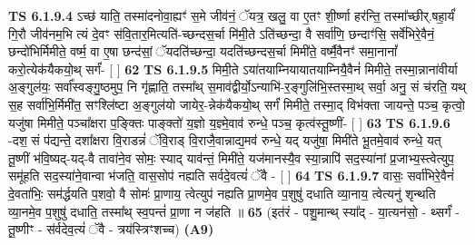 \documentclass[17pt]{extarticle}
\begin{document}
                  \newline
                                \textbf{ TS 6.1.9.4} \newline
                  ऽच्छ॑ याति॒ तस्मा॑दनोवा॒ह्यꣳ॑ स॒मे जीव॑नं॒ ॅयत्र॒ खलु॒ वा ए॒तꣳ शी॒र्ष्णा हर॑न्ति॒ तस्मा᳚च्छीर्.षहा॒र्यं॑ गि॒रौ जीव॑नम॒भि त्यं दे॒वꣳ स॑वि॒तार॒मित्यति॑-च्छन्दस॒र्चा मि॑मी॒ते ऽति॑च्छन्दा॒ वै सर्वा॑णि॒ छन्दाꣳ॑सि॒ सर्वे॑भिरे॒वैनं॒ छन्दो॑भिर्मिमीते॒ वर्ष्म॒ वा ए॒षा छन्द॑सां॒ ॅयदति॑च्छन्दा॒ यदति॑च्छन्दस॒र्चा मिमी॑ते॒ वर्ष्मै॒वैनꣳ॑ समा॒नानां᳚ करो॒त्येक॑यैकयो॒थ् सर्गं॑- [  ] \textbf{  62} \newline
                  \newline
                                \textbf{ TS 6.1.9.5} \newline
                  मिमी॒ते ऽया॑तयाम्नियायातयाम्नियै॒वैनं॑ मिमीते॒ तस्मा॒न्नाना॑वीर्या अ॒ङ्गुल॑यः॒ सर्वा᳚स्वङ्गु॒ष्ठमुप॒ नि गृ॑ह्णाति॒ तस्मा᳚थ् स॒माव॑द्वीर्यो॒ऽन्याभि॑-र॒ङ्गुलि॑भि॒स्तस्मा॒थ् सर्वा॒ अनु॒ सं च॑रति॒ यथ् स॒ह सर्वा॑भि॒र्मिमी॑त॒ सꣳश्लि॑ष्टा अ॒ङ्गुल॑यो जायेर॒-न्नेक॑यैकयो॒थ् सर्गं॑ मिमीते॒ तस्मा॒द् विभ॑क्ता जायन्ते॒ पञ्च॒ कृत्वो॒ यजु॑षा मिमीते॒ पञ्चा᳚क्षरा प॒ङ्क्तिः पाङ्क्तो॑ य॒ज्ञो य॒ज्ञ्मे॒वाव॑ रुन्धे॒ पञ्च॒ कृत्व॑स्तू॒ष्णीं- [  ] \textbf{  63} \newline
                  \newline
                                \textbf{ TS 6.1.9.6} \newline
                  -दश॒ सं प॑द्यन्ते॒ दशा᳚क्षरा वि॒राडन्नं॑ ॅवि॒राड् वि॒राजै॒वान्नाद्य॒मव॑ रुन्धे॒ यद् यजु॑षा॒ मिमी॑ते भू॒तमे॒वाव॑ रुन्धे॒ यत् तू॒ष्णीं भ॑वि॒ष्यद्-यद्-वै तावा॑ने॒व सोमः॒ स्याद् याव॑न्तं॒ मिमी॑ते॒ यज॑मानस्यै॒व स्या॒न्नापि॑ सद॒स्या॑नां प्र॒जाभ्य॒स्त्वेत्युप॒ समू॑हति सद॒स्या॑ने॒वान्वा भ॑जति॒ वास॒सोप॑ नह्यति सर्वदे॒वत्यं॑ ॅवै - [  ] \textbf{  64} \newline
                  \newline
                                \textbf{ TS 6.1.9.7} \newline
                  वासः॒ सर्वा॑भिरे॒वैनं॑ दे॒वता॑भिः॒ सम॑र्द्धयति प॒शवो॒ वै सोमः॑ प्रा॒णाय॒ त्वेत्युप॑ नह्यति प्रा॒णमे॒व प॒शुषु॑ दधाति व्या॒नाय॒ त्वेत्यनु॑ शृन्थति व्या॒नमे॒व प॒शुषु॑ दधाति॒ तस्मा᳚थ् स्व॒पन्तं॑ प्रा॒णा न ज॑हति ॥ \textbf{  65} \newline
                  \newline
                      (इत॑रं - पशु॒मान्थ् स्या᳚द् - या॒त्यन॑सो॒ - थ्सर्गं॑ - तू॒ष्णीꣳ - स॑र्वदेव॒त्यं॑ ॅवै - त्रय॑स्त्रिꣳशच्च)  \textbf{(A9)} \newline \newline
\end{document}
